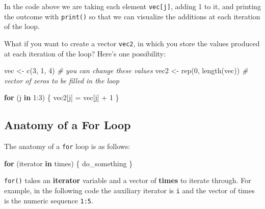 \documentclass[
]{book}
\newenvironment{Shaded}{\begin{snugshade}}{\end{snugshade}}
\newcommand{\CommentTok}[1]{\textcolor[rgb]{0.56,0.35,0.01}{\textit{#1}}}
\newcommand{\ControlFlowTok}[1]{\textcolor[rgb]{0.13,0.29,0.53}{\textbf{#1}}}
\newcommand{\DecValTok}[1]{\textcolor[rgb]{0.00,0.00,0.81}{#1}}
\newcommand{\FunctionTok}[1]{\textcolor[rgb]{0.00,0.00,0.00}{#1}}
\newcommand{\NormalTok}[1]{#1}
\newcommand{\OtherTok}[1]{\textcolor[rgb]{0.56,0.35,0.01}{#1}}
\newcommand{\SpecialCharTok}[1]{\textcolor[rgb]{0.00,0.00,0.00}{#1}}
\begin{document}
In the code above we are taking each element \texttt{vec{[}j{]}}, adding 1 to it,
and printing the outcome with \texttt{print()} so that we can visualize the additions
at each iteration of the loop.

What if you want to create a vector \texttt{vec2}, in which you store the values
produced at each iteration of the loop? Here's one possibility:

\begin{Shaded}
\begin{Highlighting}[]
\NormalTok{vec }\OtherTok{\textless{}{-}} \FunctionTok{c}\NormalTok{(}\DecValTok{3}\NormalTok{, }\DecValTok{1}\NormalTok{, }\DecValTok{4}\NormalTok{)  }\CommentTok{\# you can change these values}
\NormalTok{vec2 }\OtherTok{\textless{}{-}} \FunctionTok{rep}\NormalTok{(}\DecValTok{0}\NormalTok{, }\FunctionTok{length}\NormalTok{(vec))  }\CommentTok{\# vector of zeros to be filled in the loop}

\ControlFlowTok{for}\NormalTok{ (j }\ControlFlowTok{in} \DecValTok{1}\SpecialCharTok{:}\DecValTok{3}\NormalTok{) \{}
\NormalTok{  vec2[j] }\OtherTok{=}\NormalTok{ vec[j] }\SpecialCharTok{+} \DecValTok{1}
\NormalTok{\}}
\end{Highlighting}
\end{Shaded}

\hypertarget{anatomy-of-a-for-loop}{%
\subsection{Anatomy of a For Loop}\label{anatomy-of-a-for-loop}}

The anatomy of a \texttt{for} loop is as follows:

\begin{Shaded}
\begin{Highlighting}[]
\ControlFlowTok{for}\NormalTok{ (iterator }\ControlFlowTok{in}\NormalTok{ times) \{ }
\NormalTok{  do\_something}
\NormalTok{\}}
\end{Highlighting}
\end{Shaded}

\texttt{for()} takes an \textbf{iterator} variable and a vector of \textbf{times} to iterate
through. For example, in the following code the auxiliary iterator is \texttt{i}
and the vector of times is the numeric sequence \texttt{1:5}.
\end{document}

